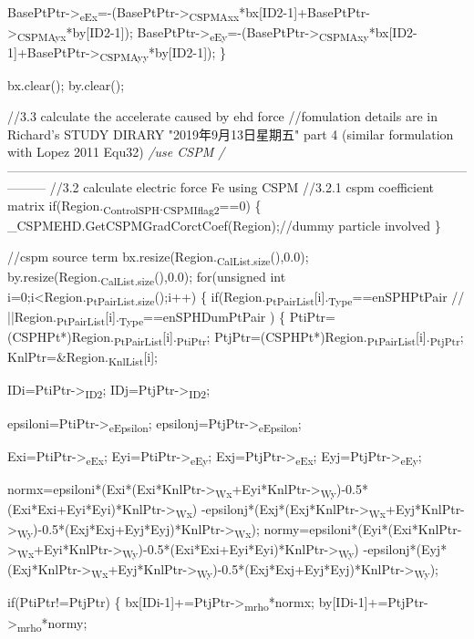 \documentclass[presentation]{beamer}
\begin{document}
  BasePtPtr->\textsubscript{eEx}=-(BasePtPtr->\textsubscript{CSPMAxx}*bx[ID2-1]+BasePtPtr->\textsubscript{CSPMAyx}*by[ID2-1]);
  BasePtPtr->\textsubscript{eEy}=-(BasePtPtr->\textsubscript{CSPMAxy}*bx[ID2-1]+BasePtPtr->\textsubscript{CSPMAyy}*by[ID2-1]);
\}

bx.clear();
by.clear();


//3.3 calculate the accelerate caused by ehd force
//fomulation details are in Richard's STUDY DIRARY "2019年9月13日星期五" part 4 (similar formulation with Lopez 2011 Equ32)
\emph{/use CSPM
/}---------------------------------------------------------------------------------------------------------------------
//3.2 calculate electric force Fe using CSPM
//3.2.1 cspm coefficient matrix
if(Region.\textsubscript{ControlSPH}.\textsubscript{CSPMIflag2}==0)
  \{
    \_CSPMEHD.GetCSPMGradCorctCoef(Region);//dummy particle involved
  \}

//cspm source term
bx.resize(Region.\textsubscript{CalList.size}(),0.0);
by.resize(Region.\textsubscript{CalList.size}(),0.0);
for(unsigned int i=0;i<Region.\textsubscript{PtPairList.size}();i++)
  \{
    if(Region.\textsubscript{PtPairList}[i].\textsubscript{Type}==enSPHPtPair
       // ||Region.\textsubscript{PtPairList}[i].\textsubscript{Type}==enSPHDumPtPair
       )
      \{
        PtiPtr=(CSPHPt*)Region.\textsubscript{PtPairList}[i].\textsubscript{PtiPtr};
        PtjPtr=(CSPHPt*)Region.\textsubscript{PtPairList}[i].\textsubscript{PtjPtr};
        KnlPtr=\&Region.\textsubscript{KnlList}[i];

IDi=PtiPtr->\textsubscript{ID2};
IDj=PtjPtr->\textsubscript{ID2};

epsiloni=PtiPtr->\textsubscript{eEpsilon};
epsilonj=PtjPtr->\textsubscript{eEpsilon};

Exi=PtiPtr->\textsubscript{eEx};
Eyi=PtiPtr->\textsubscript{eEy};
Exj=PtjPtr->\textsubscript{eEx};
Eyj=PtjPtr->\textsubscript{eEy};

normx=epsiloni*(Exi*(Exi*KnlPtr->\textsubscript{Wx}+Eyi*KnlPtr->\textsubscript{Wy})-0.5*(Exi*Exi+Eyi*Eyi)*KnlPtr->\textsubscript{Wx})
  -epsilonj*(Exj*(Exj*KnlPtr->\textsubscript{Wx}+Eyj*KnlPtr->\textsubscript{Wy})-0.5*(Exj*Exj+Eyj*Eyj)*KnlPtr->\textsubscript{Wx});
normy=epsiloni*(Eyi*(Exi*KnlPtr->\textsubscript{Wx}+Eyi*KnlPtr->\textsubscript{Wy})-0.5*(Exi*Exi+Eyi*Eyi)*KnlPtr->\textsubscript{Wy})
  -epsilonj*(Eyj*(Exj*KnlPtr->\textsubscript{Wx}+Eyj*KnlPtr->\textsubscript{Wy})-0.5*(Exj*Exj+Eyj*Eyj)*KnlPtr->\textsubscript{Wy});

if(PtiPtr!=PtjPtr)
  \{
    bx[IDi-1]+=PtjPtr->\textsubscript{mrho}*normx;
    by[IDi-1]+=PtjPtr->\textsubscript{mrho}*normy;
\end{document}
